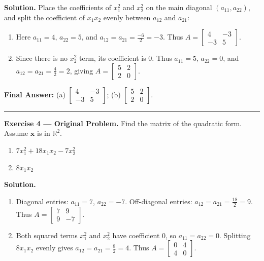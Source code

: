\documentclass[11pt, letterpaper]{article}
\theoremstyle{definition}
\theoremstyle{remark}
\newcommand{\R}{\mathbb{R}}
\begin{document}
\textbf{Solution.}
Place the coefficients of $x_1^2$ and $x_2^2$ on the main diagonal $(a_{11}, a_{22})$, and split the coefficient of $x_1x_2$ evenly between $a_{12}$ and $a_{21}$:
\begin{enumerate}[label=\alph*.]
    \item Here $a_{11} = 4$, $a_{22} = 5$, and $a_{12} = a_{21} = \frac{-6}{2} = -3$. Thus $A = \begin{bmatrix} 4 & -3 \\ -3 & 5 \end{bmatrix}$.
    \item Since there is no $x_2^2$ term, its coefficient is $0$. Thus $a_{11} = 5$, $a_{22} = 0$, and $a_{12} = a_{21} = \frac{4}{2} = 2$, giving $A = \begin{bmatrix} 5 & 2 \\ 2 & 0 \end{bmatrix}$.
\end{enumerate}

\textbf{Final Answer:} (a) $\begin{bmatrix} 4 & -3 \\ -3 & 5 \end{bmatrix}$; \quad (b) $\begin{bmatrix} 5 & 2 \\ 2 & 0 \end{bmatrix}$.

\medskip
\hrule
\medskip

\textbf{Exercise 4 --- Original Problem.} Find the matrix of the quadratic form. Assume $\mathbf{x}$ is in $\R^2$.
\begin{enumerate}[label=\alph*.]
    \item $7x_1^2 + 18x_1x_2 - 7x_2^2$
    \item $8x_1x_2$
\end{enumerate}

\textbf{Solution.}
\begin{enumerate}[label=\alph*.]
    \item Diagonal entries: $a_{11} = 7$, $a_{22} = -7$. Off-diagonal entries: $a_{12} = a_{21} = \frac{18}{2} = 9$. Thus $A = \begin{bmatrix} 7 & 9 \\ 9 & -7 \end{bmatrix}$.
    \item Both squared terms $x_1^2$ and $x_2^2$ have coefficient $0$, so $a_{11} = a_{22} = 0$. Splitting $8x_1x_2$ evenly gives $a_{12} = a_{21} = \frac{8}{2} = 4$. Thus $A = \begin{bmatrix} 0 & 4 \\ 4 & 0 \end{bmatrix}$.
\end{enumerate}
\end{document}
